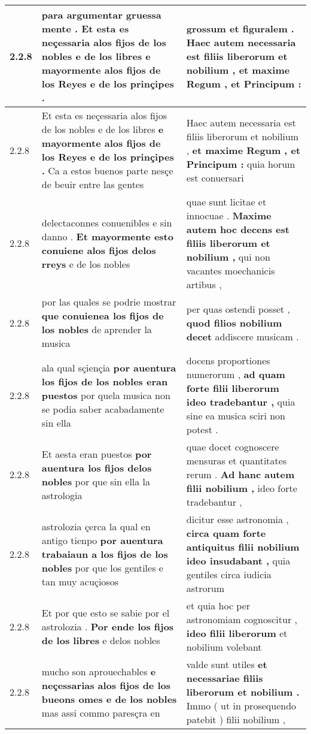 \begin{tabular}{|p{1cm}|p{6.5cm}|p{6.5cm}|}
2.2.8 & para argumentar gruessa mente . \textbf{ Et esta es neçessaria alos fijos de los nobles e de los libres } e mayormente alos fijos de los Reyes e de los prinçipes . & grossum et figuralem . \textbf{ Haec autem necessaria est filiis liberorum et nobilium , } et maxime Regum , et Principum : \\\hline
2.2.8 & Et esta es neçessaria alos fijos de los nobles e de los libres \textbf{ e mayormente alos fijos de los Reyes e de los prinçipes . } Ca a estos buenos parte nesçe de beuir entre las gentes & Haec autem necessaria est filiis liberorum et nobilium , \textbf{ et maxime Regum , et Principum : } quia horum est conuersari \\\hline
2.2.8 & delectaconnes conuenibles e sin danno . \textbf{ Et mayormente esto conuiene alos fijos delos rreys } e de los nobles & quae sunt licitae et innocuae . \textbf{ Maxime autem hoc decens est filiis liberorum et nobilium , } qui non vacantes moechanicis artibus , \\\hline
2.2.8 & por las quales se podrie mostrar \textbf{ que conuienea los fijos de los nobles } de aprender la musica & per quas ostendi posset , \textbf{ quod filios nobilium decet } addiscere musicam . \\\hline
2.2.8 & ala qual sçiençia \textbf{ por auentura los fijos de los nobles eran puestos } por quela musica non se podia saber acabadamente sin ella & docens proportiones numerorum , \textbf{ ad quam forte filii liberorum ideo tradebantur , } quia sine ea musica sciri non potest . \\\hline
2.2.8 & Et aesta eran puestos \textbf{ por auentura los fijos delos nobles } por que sin ella la astrologia & quae docet cognoscere mensuras et quantitates rerum . \textbf{ Ad hanc autem filii nobilium , } ideo forte tradebantur , \\\hline
2.2.8 & astrolozia çerca la qual en antigo tienpo \textbf{ por auentura trabaiaun a los fijos de los nobles } por que los gentiles e tan muy acuçiosos & dicitur esse astronomia , \textbf{ circa quam forte antiquitus filii nobilium ideo insudabant , } quia gentiles circa iudicia astrorum \\\hline
2.2.8 & Et por que esto se sabie por el astrolozia . \textbf{ Por ende los fijos de los libres } e delos nobles & et quia hoc per astronomiam cognoscitur , \textbf{ ideo filii liberorum } et nobilium volebant \\\hline
2.2.8 & mucho son aprouechables \textbf{ e neçessarias alos fijos de los bueons omes e de los nobles } mas assi commo paresçra en & valde sunt utiles \textbf{ et necessariae filiis liberorum et nobilium . } Immo ( ut in prosequendo patebit ) filii nobilium , \\\hline

\end{tabular}
